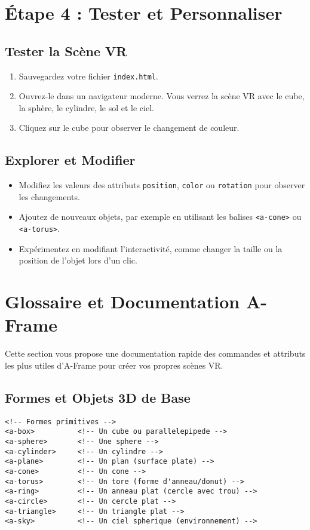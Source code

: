 \documentclass[12pt]{article}
\begin{document}
\section{Étape 4 : Tester et Personnaliser}
\subsection{Tester la Scène VR}
\begin{enumerate}
    \item Sauvegardez votre fichier \texttt{index.html}.
    \item Ouvrez-le dans un navigateur moderne. Vous verrez la scène VR avec le cube, la sphère, le cylindre, le sol et le ciel.
    \item Cliquez sur le cube pour observer le changement de couleur.
\end{enumerate}

\subsection{Explorer et Modifier}
\begin{itemize}
    \item Modifiez les valeurs des attributs \texttt{position}, \texttt{color} ou \texttt{rotation} pour observer les changements.
    \item Ajoutez de nouveaux objets, par exemple en utilisant les balises \texttt{<a-cone>} ou \texttt{<a-torus>}.
    \item Expérimentez en modifiant l'interactivité, comme changer la taille ou la position de l'objet lors d'un clic.
\end{itemize}

\section{Glossaire et Documentation A-Frame}

Cette section vous propose une documentation rapide des commandes et attributs les plus utiles d'A-Frame pour créer vos propres scènes VR.

\subsection{Formes et Objets 3D de Base}

\begin{verbatim}
<!-- Formes primitives -->
<a-box>          <!-- Un cube ou parallelepipede -->
<a-sphere>       <!-- Une sphere -->
<a-cylinder>     <!-- Un cylindre -->
<a-plane>        <!-- Un plan (surface plate) -->
<a-cone>         <!-- Un cone -->
<a-torus>        <!-- Un tore (forme d'anneau/donut) -->
<a-ring>         <!-- Un anneau plat (cercle avec trou) -->
<a-circle>       <!-- Un cercle plat -->
<a-triangle>     <!-- Un triangle plat -->
<a-sky>          <!-- Un ciel spherique (environnement) -->
\end{verbatim}
\end{document}
